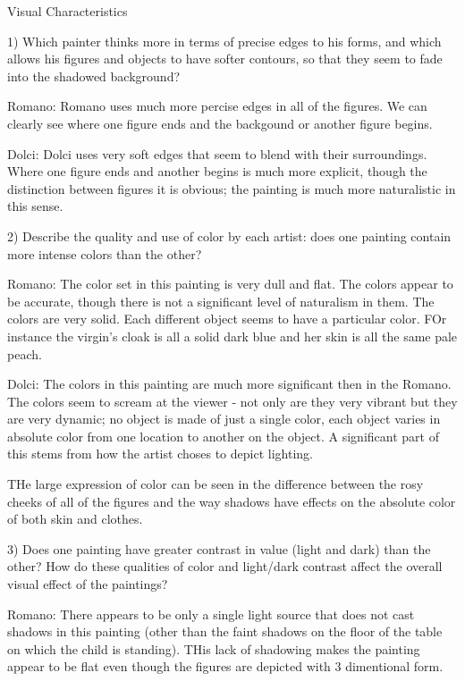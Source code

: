 Visual Characteristics

    1)  Which painter thinks more in terms of precise edges to his forms, and
        which allows his figures and objects to have softer contours, so that
        they seem to fade into the shadowed background?

        Romano:
            Romano uses much more percise edges in all of the figures.  We can
            clearly see where one figure ends and the backgound or another
            figure begins.

        Dolci:
            Dolci uses very soft edges that seem to blend with their
            surroundings. Where one figure ends and another begins is much more
            explicit, though the distinction between figures it is obvious; the
            painting is much more naturalistic in this sense.

    2) Describe the quality and use of color by each artist:  does one painting
       contain more intense colors than the other?

        Romano:
            The color set in this painting is very dull and flat.  The colors
            appear to be accurate, though there is not a significant level of
            naturalism in them.  The colors are very solid.  Each different
            object seems to have a particular color.  FOr instance the virgin's
            cloak is all a solid dark blue and her skin is all the same pale
            peach.

        Dolci:
            The colors in this painting are much more significant then in the
            Romano.  The colors seem to scream at the viewer - not only are
            they very vibrant but they are very dynamic; no object is made of
            just a single color, each object varies in absolute color from one
            location to another on the object.  A significant part of this
            stems from how the artist choses to depict lighting.

            THe large expression of color can be seen in the difference between
            the rosy cheeks of all of the figures and the way shadows have
            effects on the absolute color of both skin and clothes.

    3)  Does one painting have greater contrast in value (light and dark) than
        the other?  How do these qualities of color and light/dark contrast
        affect the overall visual effect of the paintings?

        Romano:
            There appears to be only a single light source that does not cast
            shadows in this painting (other than the faint shadows on the floor
            of the table on which the child is standing).  THis lack of
            shadowing makes the painting appear to be flat even though the
            figures are depicted with 3 dimentional form.

